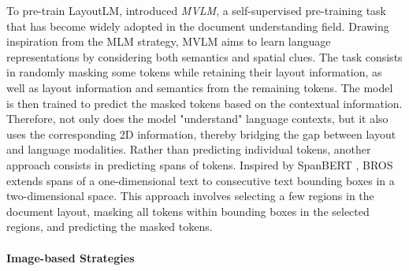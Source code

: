To pre-train LayoutLM, \citet{xu2020layoutlm} introduced \textit{\ac{MVLM}}, a self-supervised pre-training task that has become widely adopted in the document understanding field. Drawing inspiration from the \ac{MLM} strategy, \ac{MVLM} aims to learn language representations by considering both semantics and spatial clues. The task consists in randomly masking some tokens while retaining their layout information, as well as layout information and semantics from the remaining tokens. The model is then trained to predict the masked tokens based on the contextual information. Therefore, not only does the model "understand" language contexts, but it also uses the corresponding 2D information, thereby bridging the gap between layout and language modalities.
Rather than predicting individual tokens, another approach consists in predicting spans of tokens. Inspired by SpanBERT \citep{joshi2020spanbert}, BROS \citep{hong2020bros} extends spans of a one-dimensional text to consecutive text bounding boxes in a two-dimensional space. This approach involves selecting a few regions in the document layout, masking all tokens within bounding boxes in the selected regions, and predicting the masked tokens. 

\paragraph{Image-based Strategies}


